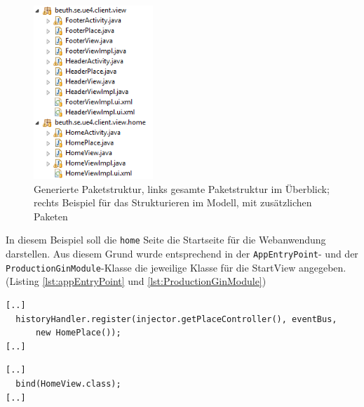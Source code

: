 \begin{figure}[htbp]
\begin{center}
\includegraphics[width=0.4\textwidth]{./img/PackagesExample.png}
\caption{Generierte Paketstruktur, links gesamte
Paketstruktur im Überblick; rechts Beispiel für das
Strukturieren im Modell, mit zusätzlichen Paketen}\label{Fig:packegeModel}
\end{center}
\end{figure}
 
In diesem Beispiel soll die \texttt{home} Seite die Startseite für die
Webanwendung darstellen. Aus diesem Grund wurde entsprechend in der
\texttt{AppEntryPoint}- und der \texttt{ProductionGinModule}-Klasse die
jeweilige Klasse für die StartView angegeben. (Listing \ref{lst:appEntryPoint}
und \ref{lst:ProductionGinModule}) 
\lstset{language=gwt}
\begin{lstlisting}[caption={Änderung an der \texttt{AppEntryPoint}-Klasse zur
Bestimmung der Startseite}, label={lst:appEntryPoint}] 
[..]
  historyHandler.register(injector.getPlaceController(), eventBus,
      new HomePlace());
[..]
\end{lstlisting}
\lstset{language=gwt}
\begin{lstlisting}[caption={Änderung an der \texttt{ProductionGinModule}-Klasse
zur Bestimmung der Startseite}, label={lst:ProductionGinModule}] 
[..]
  bind(HomeView.class);
[..]
\end{lstlisting}

